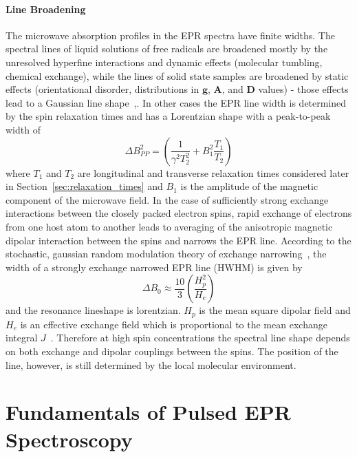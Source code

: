 \paragraph{Line Broadening}
The microwave absorption profiles in the EPR spectra have finite widths. The spectral lines of liquid solutions of free radicals are broadened mostly by the unresolved hyperfine interactions and dynamic effects (molecular tumbling, chemical exchange), while the lines of solid state samples are broadened by static effects (orientational disorder, distributions in $\textbf{g}$, $\textbf{A}$, and $\textbf{D}$ values) - those effects lead to a Gaussian line shape~\cite{Stoll2006},\cite{Eaton_book}. In other cases the EPR line width is determined by the spin relaxation times and has a Lorentzian shape with a peak-to-peak width of~\cite{Eaton_book}\\
\begin{equation}
\Delta B_{PP}^2=\left(\frac{1}{\gamma^2T_2^2}+B_1^2\frac{T_1}{T_2}\right)
\end{equation}
where $T_1$ and $T_2$ are longitudinal and transverse relaxation times considered later in Section~\ref{sec:relaxation_times} and $B_1$ is the amplitude of the magnetic component of the microwave field.
In the case of sufficiently strong exchange interactions between the closely packed electron spins, rapid exchange of electrons from one host atom to another leads to averaging of the anisotropic magnetic dipolar interaction between the spins and narrows the EPR line. According to the stochastic, gaussian random modulation theory of exchange narrowing~\cite{Oreilly_1971}, the width of a strongly exchange narrowed EPR line (HWHM) is given by
\begin{equation}
\label{eq:exch_narrowing}
\Delta B_0 \approx\frac{10}{3}\left(\frac{H_p^2}{H_e}\right)
\end{equation}
and the resonance lineshape is lorentzian. $H_p$ is the mean square dipolar field and $H_e$ is an effective exchange field which is proportional to the mean exchange integral $J$~\cite{Oreilly_1971}. Therefore at high spin concentrations the spectral line shape depends on both exchange and dipolar couplings between the spins. The position of the line, however, is still determined by the local molecular environment.\\


\section{Fundamentals of Pulsed EPR Spectroscopy}
\label{ch:pulsed_epr}


